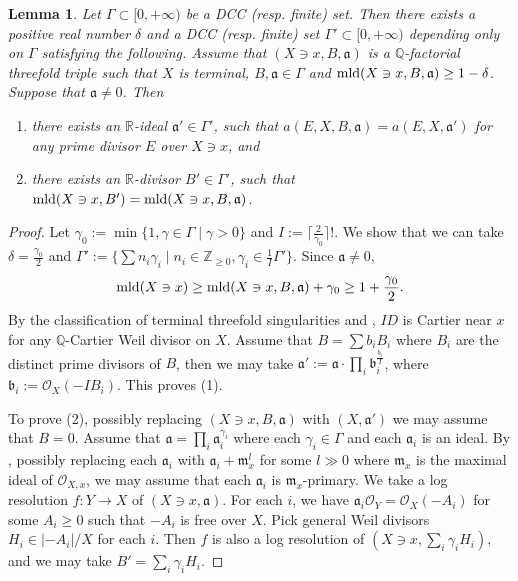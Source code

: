 \documentclass[11pt]{amsart}
\numberwithin{equation}{section}
\newcommand{\Qq}{\mathbb{Q}}
\newcommand{\Rr}{\mathbb{R}}
\newcommand{\Zz}{\mathbb{Z}}
\newcommand{\aaa}{\mathfrak{a}}
\newcommand{\bbb}{\mathfrak{b}}
\newcommand{\mmm}{\mathfrak{m}}
\newcommand{\mld}{{\rm{mld}}}
\newcommand{\Ii}{{\Gamma}}
\newtheorem{lem}[thm]{Lemma}
\theoremstyle{definition}
\theoremstyle{definition}
\begin{document}
\begin{lem}\label{lem: transform pair to ideal adic}
Let $\Ii\subset [0,+\infty)$ be a DCC (resp. finite) set. Then there exists a positive real number $\delta$ and a DCC (resp. finite) set $\Ii'\subset [0,+\infty)$ depending only on $\Ii$ satisfying the following. Assume that $(X\ni x,B,\aaa)$ is a $\Qq$-factorial threefold triple such that $X$ is terminal, $B,\aaa\in\Ii$ and $\mld(X\ni x,B,\aaa)\geq 1-\delta$. Suppose that $\aaa\not=\mathfrak{0}$. Then
\begin{enumerate}
    \item there exists an $\Rr$-ideal $\aaa'\in\Ii'$, such that $a(E,X,B,\aaa)=a(E,X,\aaa')$ for any prime divisor $E$ over $X\ni x$, and
    \item there exists an $\Rr$-divisor $B'\in\Ii'$, such that $\mld(X\ni x,B')=\mld(X\ni x,B,\aaa)$.
\end{enumerate}
\end{lem}
\begin{proof}
Let $\gamma_0:=\min\{1,\gamma\in\Ii\mid \gamma>0\}$ and $I:=\lceil\frac{2}{\gamma_0}\rceil!$. We show that we can take $\delta=\frac{\gamma_0}{2}$ and $\Ii':=\{\sum n_i\gamma_i\mid n_i\in\Zz_{\geq 0},\gamma_i\in\frac{1}{I}\Ii'\}$. Since $\aaa\not=\mathfrak{0}$,
$$\mld(X\ni x)\geq\mld(X\ni x,B,\aaa)+\gamma_0\geq 1+\frac{\gamma_0}{2}.$$
By the classification of terminal threefold singularities and \cite[Lemma~5.1]{Kaw88}, $ID$ is Cartier near $x$ for any $\Qq$-Cartier Weil divisor on $X$.  Assume that $B=\sum b_iB_i$ where $B_i$ are the distinct prime divisors of $B$, then we may take $\aaa':=\aaa\cdot\prod_i\bbb_i^{\frac{b_i}{I}}$, where $\bbb_i:=\mathcal{O}_X(-IB_i)$. This proves (1).

To prove (2), possibly replacing $(X\ni x,B,\aaa)$ with $(X,\aaa')$ we may assume that $B=0$. Assume that $\aaa=\prod_i\aaa_i^{\gamma_i}$ where each $\gamma_i\in\Ii$ and each $\aaa_i$ is an ideal. By \cite[Proposition 2.2 iv)]{MN18}, possibly replacing each $\aaa_i$ with $\aaa_i+\mmm_x^l$ for some $l\gg 0$ where $\mmm_x$ is the maximal ideal of $\mathcal{O}_{X,x}$, we may assume that each $\aaa_i$ is $\mmm_x$-primary. We take a log resolution $f: Y\rightarrow X$ of $(X\ni x,\aaa)$. For each $i$, we have $\aaa_i\mathcal{O}_Y=\mathcal{O}_X(-A_i)$ for some $A_i\geq 0$ such that $-A_i$ is free over $X$. Pick general Weil divisors $H_i\in |-A_i|/X$ for each $i$. Then $f$ is also a log resolution of $(X\ni x,\sum_i\gamma_iH_i)$, and we may take $B'=\sum_i\gamma_iH_i$.
\end{proof}
\end{document}
